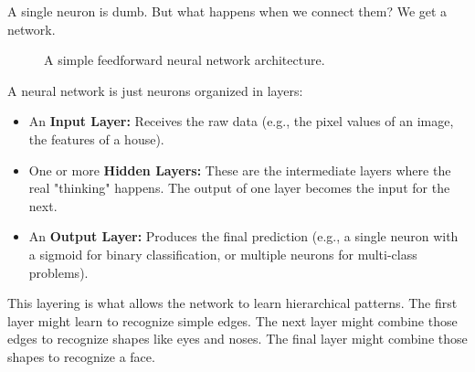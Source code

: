 \documentclass[11pt, letterpaper, openany]{book}
\begin{document}
A single neuron is dumb. But what happens when we connect them? We get a network.

\begin{figure}[h!]
\centering
{}
\caption{A simple feedforward neural network architecture.}
\end{figure}

A neural network is just neurons organized in layers:
\begin{itemize}
    \item An \textbf{Input Layer:} Receives the raw data (e.g., the pixel values of an image, the features of a house).
    \item One or more \textbf{Hidden Layers:} These are the intermediate layers where the real "thinking" happens. The output of one layer becomes the input for the next.
    \item An \textbf{Output Layer:} Produces the final prediction (e.g., a single neuron with a sigmoid for binary classification, or multiple neurons for multi-class problems).
\end{itemize}
This layering is what allows the network to learn hierarchical patterns. The first layer might learn to recognize simple edges. The next layer might combine those edges to recognize shapes like eyes and noses. The final layer might combine those shapes to recognize a face.
\end{document}
